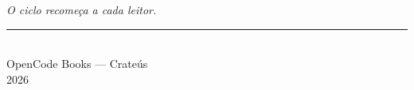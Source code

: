 \thispagestyle{empty}
\null\vfill
\begin{center}
{\itshape O ciclo recomeça a cada leitor.}\\[1.2em]
{\color{epi}\rule{0.2\textwidth}{1pt}}\\[1.2em]
{\small OpenCode Books --- Crateús}\\
{\small 2026}
\end{center}
\vfill
